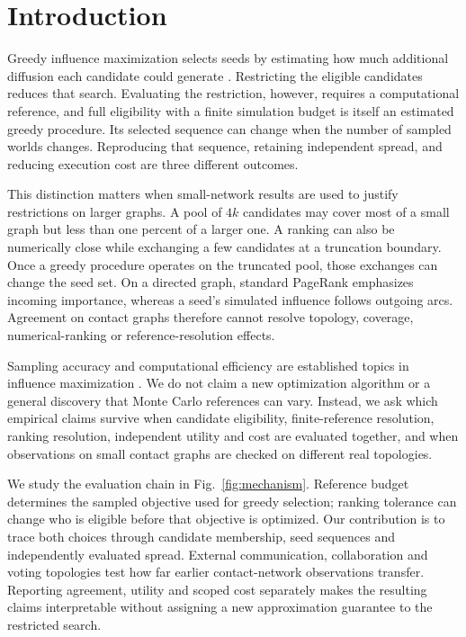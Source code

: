 \documentclass[smallextended]{svjour3}
\begin{document}
\section{Introduction}
Greedy influence maximization selects seeds by estimating how much additional diffusion each candidate could generate \cite{ref1}. Restricting the eligible candidates reduces that search. Evaluating the restriction, however, requires a computational reference, and full eligibility with a finite simulation budget is itself an estimated greedy procedure. Its selected sequence can change when the number of sampled worlds changes. Reproducing that sequence, retaining independent spread, and reducing execution cost are three different outcomes.

This distinction matters when small-network results are used to justify restrictions on larger graphs. A pool of $4k$ candidates may cover most of a small graph but less than one percent of a larger one. A ranking can also be numerically close while exchanging a few candidates at a truncation boundary. Once a greedy procedure operates on the truncated pool, those exchanges can change the seed set. On a directed graph, standard PageRank emphasizes incoming importance, whereas a seed's simulated influence follows outgoing arcs. Agreement on contact graphs therefore cannot resolve topology, coverage, numerical-ranking or reference-resolution effects.

Sampling accuracy and computational efficiency are established topics in influence maximization \cite{ref2,ref8,ref9,ref16}. We do not claim a new optimization algorithm or a general discovery that Monte Carlo references can vary. Instead, we ask which empirical claims survive when candidate eligibility, finite-reference resolution, ranking resolution, independent utility and cost are evaluated together, and when observations on small contact graphs are checked on different real topologies.

We study the evaluation chain in Fig.~\ref{fig:mechanism}. Reference budget determines the sampled objective used for greedy selection; ranking tolerance can change who is eligible before that objective is optimized. Our contribution is to trace both choices through candidate membership, seed sequences and independently evaluated spread. External communication, collaboration and voting topologies test how far earlier contact-network observations transfer. Reporting agreement, utility and scoped cost separately makes the resulting claims interpretable without assigning a new approximation guarantee to the restricted search.
\end{document}
